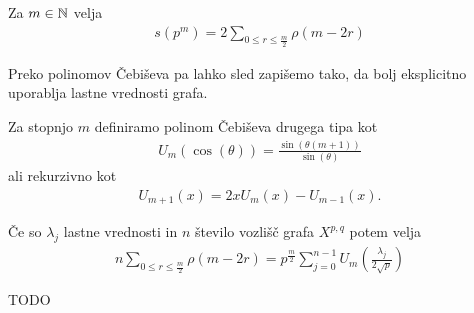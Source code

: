 \begin{izrek}
    Za \(m\in \mathbb N\) velja
    \begin{align*}
        s(p^m) = 2\sum_{0\leq r\leq \frac{m}{2}}\rho(m-2r)
    \end{align*}
\end{izrek}
\begin{dokaz}
\end{dokaz}

Preko polinomov Čebiševa pa lahko sled zapišemo tako, da bolj eksplicitno uporablja lastne vrednosti grafa.
\begin{definicija}
    Za stopnjo \(m\) definiramo polinom Čebiševa drugega tipa kot 
    \begin{align*}
        U_m(\cos(\theta)) = \frac{\sin(\theta(m+1))}{\sin(\theta)}
    \end{align*}
    ali rekurzivno kot
    \begin{align*}
        U_{m+1}(x) = 2xU_m(x) - U_{m-1}(x).
    \end{align*}
\end{definicija}

\begin{izrek}
    Če so \(\lambda_j\) lastne vrednosti in \(n\) število vozlišč grafa \(X^{p,q}\) potem velja
    \begin{align*}
        n\sum_{0\leq r \leq \frac{m}{2}} \rho(m-2r) = p^{\frac{m}{2}}\sum_{j=0}^{n-1} U_m \left(\frac{\lambda_j}{2\sqrt{p}}\right)
    \end{align*}
\end{izrek}

\begin{dokaz}
    TODO
\end{dokaz}








